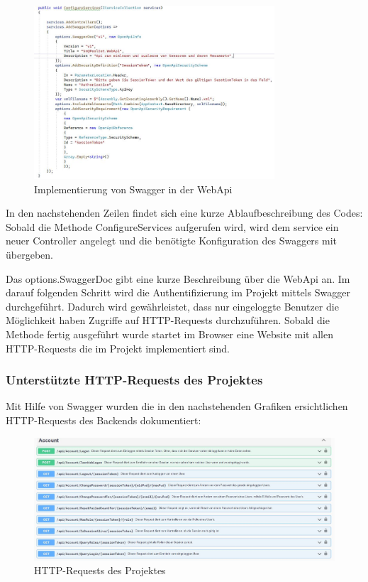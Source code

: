 \begin{figure}[H]
    \centering
    \includegraphics[width=0.8\textwidth]{pics/SwaggerImplementation.JPG}
    \caption{Implementierung von Swagger in der WebApi}
\end{figure}

In den nachstehenden Zeilen findet sich eine kurze Ablaufbeschreibung des Codes:
Sobald die Methode ConfigureServices aufgerufen wird, wird dem service ein neuer Controller angelegt und die benötigte Konfiguration des Swaggers mit übergeben. 

Das options.SwaggerDoc gibt eine kurze Beschreibung über die WebApi an.
Im darauf folgenden Schritt wird die Authentifizierung im Projekt mittels Swagger durchgeführt. Dadurch wird gewährleistet, dass nur eingeloggte Benutzer die Möglichkeit haben Zugriffe auf HTTP-Requests durchzuführen.
Sobald die Methode fertig ausgeführt wurde startet im Browser eine Website mit allen HTTP-Requests die im Projekt implementiert sind.

\subsubsection*{Unterstützte HTTP-Requests des Projektes}
Mit Hilfe von Swagger wurden die in den nachstehenden Grafiken ersichtlichen HTTP-Requests des Backends dokumentiert:

\begin{figure}[H]
    \flushleft
    \includegraphics[width=1.6\textwidth]{pics/WebApiRequests1.JPG}
    \caption{HTTP-Requests des Projektes}
\end{figure}

